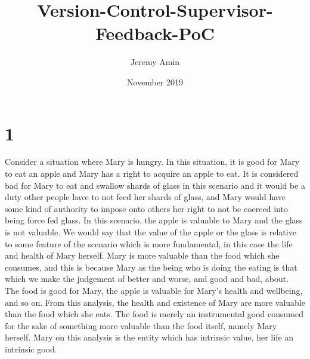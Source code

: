 \documentclass{article}
\title{Version-Control-Supervisor-Feedback-PoC}
\author{Jeremy Amin}
\date{November 2019}
\begin{document}
\maketitle
\tableofcontents

\pagebreak

\section{1}

Consider a situation where Mary is hungry. In this situation, it is good for Mary to eat an apple and Mary has a right to acquire an apple to eat. It is considered bad for Mary to eat and swallow shards of glass in this scenario and it would be a duty other people have to not feed her shards of glass, and Mary would have some kind of authority to impose onto others her right to not be coerced into being force fed glass. In this scenario, the apple is valuable to Mary and the glass is not valuable. We would say that the value of the apple or the glass is relative to some feature of the scenario which is more fundamental, in this case the life and health of Mary herself. Mary is more valuable than the food which she consumes, and this is because Mary as the being who is doing the eating is that which we make the judgement of better and worse, and good and bad, about. The food is good for Mary, the apple is valuable for Mary’s health and wellbeing, and so on. From this analysis, the health and existence of Mary are more valuable than the food which she eats. The food is merely an instrumental good consumed for the sake of something more valuable than the food itself, namely Mary herself. Mary on this analysis is the entity which has intrinsic value, her life an intrinsic good.
\end{document}
